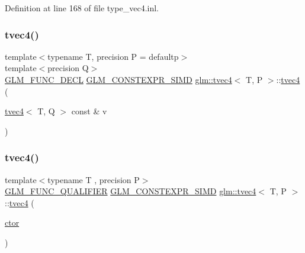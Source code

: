 Definition at line 168 of file type\+\_\+vec4.\+inl.

\mbox{\label{structglm_1_1tvec4_aa2e87b9ff21cb646a4c0ca4c848c7570}} 
\subsubsection{\texorpdfstring{tvec4()}{tvec4()}\hspace{0.1cm}{\footnotesize\ttfamily [3/35]}}
{\footnotesize\ttfamily template$<$typename T, precision P = defaultp$>$ \\
template$<$precision Q$>$ \\
\mbox{\hyperlink{setup_8hpp_ab2d052de21a70539923e9bcbf6e83a51}{G\+L\+M\+\_\+\+F\+U\+N\+C\+\_\+\+D\+E\+CL}} \mbox{\hyperlink{setup_8hpp_ae5de828d10226b21e2123dd61f3cb5ed}{G\+L\+M\+\_\+\+C\+O\+N\+S\+T\+E\+X\+P\+R\+\_\+\+S\+I\+MD}} \mbox{\hyperlink{structglm_1_1tvec4}{glm\+::tvec4}}$<$ T, P $>$\+::\mbox{\hyperlink{structglm_1_1tvec4}{tvec4}} (\begin{DoxyParamCaption}\item[{\mbox{\hyperlink{structglm_1_1tvec4}{tvec4}}$<$ T, Q $>$ const \&}]{v }\end{DoxyParamCaption})}

\mbox{\label{structglm_1_1tvec4_a9b01006ba780e0bc5858eca39f9e10f7}} 
\subsubsection{\texorpdfstring{tvec4()}{tvec4()}\hspace{0.1cm}{\footnotesize\ttfamily [4/35]}}
{\footnotesize\ttfamily template$<$typename T , precision P$>$ \\
\mbox{\hyperlink{setup_8hpp_a33fdea6f91c5f834105f7415e2a64407}{G\+L\+M\+\_\+\+F\+U\+N\+C\+\_\+\+Q\+U\+A\+L\+I\+F\+I\+ER}} \mbox{\hyperlink{setup_8hpp_ae5de828d10226b21e2123dd61f3cb5ed}{G\+L\+M\+\_\+\+C\+O\+N\+S\+T\+E\+X\+P\+R\+\_\+\+S\+I\+MD}} \mbox{\hyperlink{structglm_1_1tvec4}{glm\+::tvec4}}$<$ T, P $>$\+::\mbox{\hyperlink{structglm_1_1tvec4}{tvec4}} (\begin{DoxyParamCaption}\item[{\mbox{\hyperlink{namespaceglm_a807df837905ec286f806a536af03b57f}{ctor}}}]{ }\end{DoxyParamCaption})\hspace{0.3cm}{\ttfamily [explicit]}}



